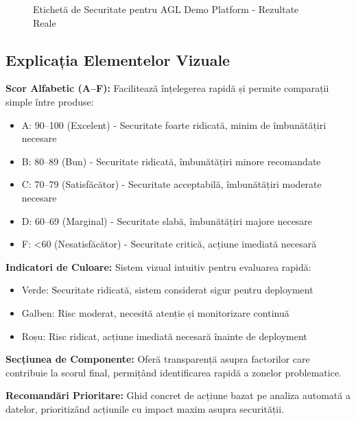 \documentclass[12pt,a4paper]{article}
\begin{document}
\begin{figure}[H]
\caption{Etichetă de Securitate pentru AGL Demo Platform - Rezultate Reale}
\end{figure}

\subsection{Explicația Elementelor Vizuale}

\textbf{Scor Alfabetic (A--F):} Facilitează înțelegerea rapidă și permite comparații simple între produse:

\begin{itemize}
\item A: 90--100 (Excelent) - Securitate foarte ridicată, minim de îmbunătățiri necesare
\item B: 80--89 (Bun) - Securitate ridicată, îmbunătățiri minore recomandate
\item C: 70--79 (Satisfăcător) - Securitate acceptabilă, îmbunătățiri moderate necesare
\item D: 60--69 (Marginal) - Securitate slabă, îmbunătățiri majore necesare
\item F: <60 (Nesatisfăcător) - Securitate critică, acțiune imediată necesară
\end{itemize}

\textbf{Indicatori de Culoare:} Sistem vizual intuitiv pentru evaluarea rapidă:

\begin{itemize}
\item Verde: Securitate ridicată, sistem considerat sigur pentru deployment
\item Galben: Risc moderat, necesită atenție și monitorizare continuă
\item Roșu: Risc ridicat, acțiune imediată necesară înainte de deployment
\end{itemize}

\textbf{Secțiunea de Componente:} Oferă transparență asupra factorilor care contribuie la scorul final, permițând identificarea rapidă a zonelor problematice.

\textbf{Recomandări Prioritare:} Ghid concret de acțiune bazat pe analiza automată a datelor, prioritizând acțiunile cu impact maxim asupra securității.
\end{document}
